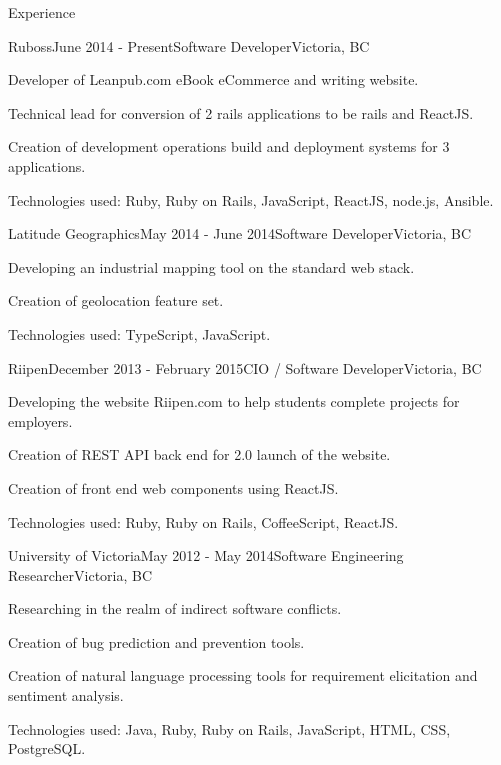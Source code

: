 \documentclass{resume} %
\begin{document}
\begin{rSection}{Experience}

\begin{rSubsection}{Ruboss}{June 2014 - Present}{Software Developer}{Victoria, BC}
\item Developer of Leanpub.com eBook eCommerce and writing website.
\item Technical lead for conversion of 2 rails applications to be rails and ReactJS.
\item Creation of development operations build and deployment systems for 3 applications.
\item Technologies used: Ruby, Ruby on Rails, JavaScript, ReactJS, node.js, Ansible.
\end{rSubsection}


\begin{rSubsection}{Latitude Geographics}{May 2014 - June 2014}{Software Developer}{Victoria, BC}
\item Developing an industrial mapping tool on the standard web stack.
\item Creation of geolocation feature set.
\item Technologies used: TypeScript, JavaScript.
\end{rSubsection}


\begin{rSubsection}{Riipen}{December 2013 - February 2015}{CIO / Software Developer}{Victoria, BC}
\item Developing the website Riipen.com to help students complete projects for employers.
\item Creation of REST API back end for 2.0 launch of the website.
\item Creation of front end web components using ReactJS.
\item Technologies used: Ruby, Ruby on Rails, CoffeeScript, ReactJS.
\end{rSubsection}


\begin{rSubsection}{University of Victoria}{May 2012 - May 2014}{Software Engineering Researcher}{Victoria, BC}
\item Researching in the realm of indirect software conflicts.
\item Creation of bug prediction and prevention tools.
\item Creation of natural language processing tools for requirement elicitation and sentiment analysis.
\item Technologies used: Java, Ruby, Ruby on Rails, JavaScript, HTML, CSS, PostgreSQL.
\end{rSubsection}


\end{rSection}
\end{document}
